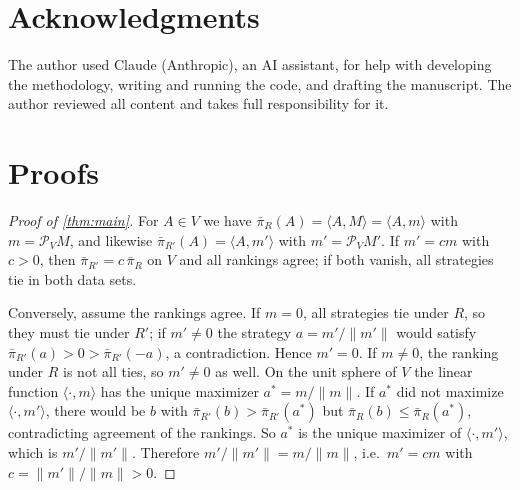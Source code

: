 \documentclass[11pt]{article}
\theoremstyle{definition}
\theoremstyle{remark}
\newcommand{\ip}[2]{\langle #1, #2 \rangle}
\newcommand{\pnl}{\bar{\pi}}
\newcommand{\Proj}{\mathcal{P}}
\begin{document}
\section*{Acknowledgments}
The author used Claude (Anthropic), an AI assistant, for help with developing the methodology, writing and running the code, and drafting the manuscript. The author reviewed
all content and takes full responsibility for it.




\clearpage
\appendix
\section{Proofs}
\label{app:proofs}

\begin{proof}[Proof of \cref{thm:main}]
For $A\in V$ we have $\pnl_R(A)=\ip{A}{M}=\ip{A}{m}$ with $m=\Proj_VM$, and likewise $\pnl_{R'}(A)=\ip{A}{m'}$ with $m'=\Proj_VM'$.
If $m'=cm$ with $c>0$, then $\pnl_{R'}=c\,\pnl_R$ on $V$ and all rankings agree; if both vanish, all strategies tie in both data sets.

Conversely, assume the rankings agree. If $m=0$, all strategies tie under $R$, so they must tie under $R'$; if $m'\neq0$ the strategy $a=m'/\|m'\|$ would satisfy
$\pnl_{R'}(a)>0>\pnl_{R'}(-a)$, a contradiction. Hence $m'=0$. If $m\ne0$, the ranking under $R$ is not all ties, so $m'\ne0$ as well. On the unit sphere of $V$ the linear function
$\ip{\cdot}{m}$ has the unique maximizer $a^\ast=m/\|m\|$. If $a^\ast$ did not maximize $\ip{\cdot}{m'}$, there would be $b$ with $\pnl_{R'}(b)>\pnl_{R'}(a^\ast)$ but
$\pnl_R(b)\le\pnl_R(a^\ast)$, contradicting agreement of the rankings. So $a^\ast$ is the unique maximizer of $\ip{\cdot}{m'}$, which is $m'/\|m'\|$. Therefore
$m'/\|m'\|=m/\|m\|$, i.e.\ $m'=cm$ with $c=\|m'\|/\|m\|>0$.
\end{proof}
\end{document}
